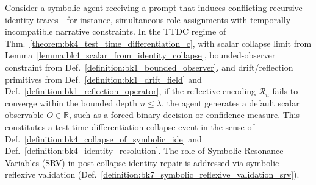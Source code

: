 \begin{demonstratio}
\label{demonstratio:bk4_prompt_time_ttdc}
Consider a symbolic agent receiving a prompt that induces conflicting recursive identity traces---for instance, simultaneous role assignments with temporally incompatible narrative constraints. In the TTDC regime of Thm.~\ref{theorem:bk4_test_time_differentiation_c}, with scalar collapse limit from Lemma~\ref{lemma:bk4_scalar_from_identity_collapse}, bounded-observer constraint from Def.~\ref{definition:bk1_bounded_observer}, and drift/reflection primitives from Def.~\ref{definition:bk1_drift_field} and Def.~\ref{definition:bk1_reflection_operator}, if the reflective encoding $\mathcal{R}_n$ fails to converge within the bounded depth $n \leq \lambda$, the agent generates a default scalar observable $O \in \mathbb{R}$, such as a forced binary decision or confidence measure. This constitutes a test-time differentiation collapse event in the sense of Def.~\ref{definition:bk4_collapse_of_symbolic_ide} and Def.~\ref{definition:bk4_identity_resolution}. The role of Symbolic Resonance Variables (SRV) in post-collapse identity repair is addressed via symbolic reflexive validation (Def.~\ref{definition:bk7_symbolic_reflexive_validation_srv}).
\end{demonstratio}

